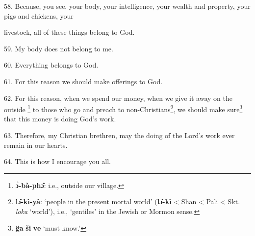 58. Because, you see, your body, your intelligence, your wealth and property, your
pigs and chickens, your

livestock, all of these things belong to God.

59. My body does not belong to me.

60. Everything belongs to God.

61. For this reason we should make offerings to God.

62. For this reason, when we spend our money, when we give it away on the outside
\footnote{\textbf{ɔ̀-bà-phɔ̂}: i.e., outside our village.} to those who go and preach to non-Christians\footnote{\textbf{lɔ̂-kì-yâ}: `people in the present mortal world' (\textbf{lɔ̂-kì} < Shan < Pali < Skt. \textit{loka} `world'), i.e., `gentiles' in the Jewish or Mormon sense.}, we should make sure\footnote{\textbf{g̈a} \textbf{ši} \textbf{ve} `must know.'} that this money is doing God's work.

63. Therefore, my Christian brethren, may the doing of the Lord's work ever remain
in our hearts.

64. This is how I encourage you all.

